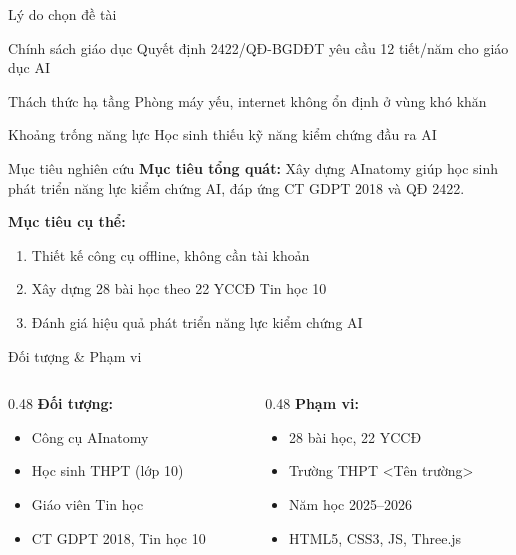\documentclass[10pt,xcolor=dvipsnames]{beamer}
\begin{document}
\begin{frame}{Lý do chọn đề tài}
  \begin{block}{Chính sách giáo dục}
    Quyết định 2422/QĐ-BGDĐT yêu cầu 12 tiết/năm cho giáo dục AI
  \end{block}
  
  \begin{block}{Thách thức hạ tầng}
    Phòng máy yếu, internet không ổn định ở vùng khó khăn
  \end{block}
  
  \begin{block}{Khoảng trống năng lực}
    Học sinh thiếu kỹ năng kiểm chứng đầu ra AI
  \end{block}
\end{frame}

\begin{frame}{Mục tiêu nghiên cứu}
  \textbf{Mục tiêu tổng quát:} Xây dựng AInatomy giúp học sinh phát triển năng lực kiểm chứng AI, đáp ứng CT GDPT 2018 và QĐ 2422.
  
  \vspace{1em}
  \textbf{Mục tiêu cụ thể:}
  \begin{enumerate}
    \item Thiết kế công cụ offline, không cần tài khoản
    \item Xây dựng 28 bài học theo 22 YCCĐ Tin học 10
    \item Đánh giá hiệu quả phát triển năng lực kiểm chứng AI
  \end{enumerate}
\end{frame}

\begin{frame}{Đối tượng \& Phạm vi}
  \begin{columns}[T]
    \begin{column}{0.48\textwidth}
      \textbf{Đối tượng:}
      \begin{itemize}
        \item Công cụ AInatomy
        \item Học sinh THPT (lớp 10)
        \item Giáo viên Tin học
        \item CT GDPT 2018, Tin học 10
      \end{itemize}
    \end{column}
    
    \begin{column}{0.48\textwidth}
      \textbf{Phạm vi:}
      \begin{itemize}
        \item 28 bài học, 22 YCCĐ
        \item Trường THPT <Tên trường>
        \item Năm học 2025--2026
        \item HTML5, CSS3, JS, Three.js
      \end{itemize}
    \end{column}
  \end{columns}
\end{frame}
\end{document}

